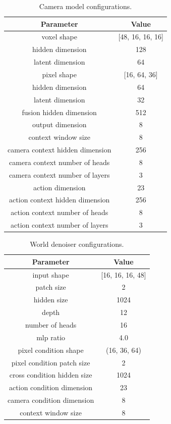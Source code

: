 \documentclass{article}
\theoremstyle{plain}
\theoremstyle{definition}
\theoremstyle{remark}
\begin{document}
\begin{table}[htb!]
\centering
\begin{tabular}{cc}\toprule  
Parameter & Value \\
\midrule
voxel shape & [48, 16, 16, 16] \\
hidden dimension & 128 \\
latent dimension & 64 \\
pixel shape & [16, 64, 36] \\
hidden dimension & 64 \\
latent dimension & 32 \\
fusion hidden dimension & 512 \\
output dimension & 8 \\
context window size & 8 \\
camera context hidden dimension & 256 \\
camera context number of heads & 8 \\
camera context number of layers & 3 \\
action dimension & 23 \\
action context hidden dimension & 256 \\
action context number of heads & 8 \\
action context number of layers & 3 \\
\bottomrule
\end{tabular}\caption{Camera model configurations.}
\label{table:cam-model}
\end{table}

\begin{table}[htb!]
\centering
\begin{tabular}{cc}\toprule  
Parameter & Value \\
\midrule
input shape & [16, 16, 16, 48] \\
patch size & 2 \\
hidden size & 1024 \\
depth & 12 \\
number of heads & 16 \\
mlp ratio & 4.0 \\
pixel condition shape & (16, 36, 64) \\
pixel condition patch size & 2 \\
cross condition hidden size & 1024 \\
action condition dimension & 23 \\
camera condition dimension & 8 \\
context window size & 8 \\
\bottomrule
\end{tabular}\caption{World denoiser configurations.}
\label{table:world-denoiser}
\end{table}
\end{document}
